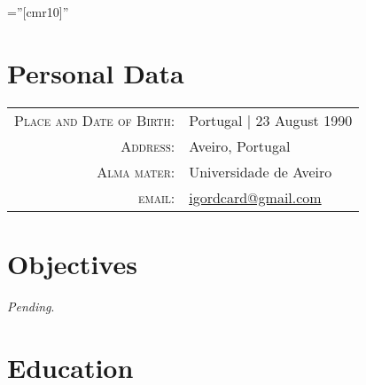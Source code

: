 \documentclass[a4paper,10pt]{article} %
\begin{document}
\pagestyle{empty} %

\font\fb=''[cmr10]'' %


\par{\bigskip\par} %

\section{Personal Data}

\begin{tabular}{rl}
\textsc{Place and Date of Birth:} & Portugal  | 23 August 1990 \\
\textsc{Address:} & Aveiro, Portugal \\
\textsc{Alma mater:} & Universidade de Aveiro\\
\textsc{email:} & \href{mailto:igordcard+cv@gmail.com}{igordcard@gmail.com}
\end{tabular}


\section{Objectives}

\textit{Pending}.


\section{Education}
\end{document}
